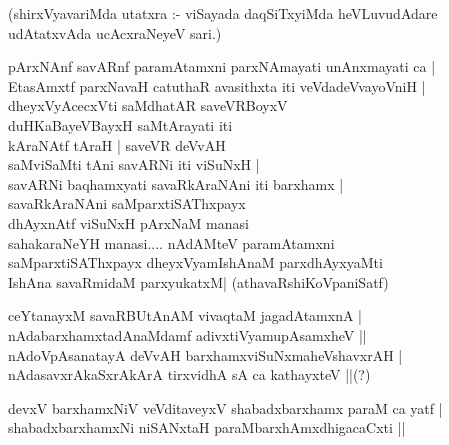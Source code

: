 (shirxVyavariMda utatxra :- viSayada daqSiTxyiMda heVLuvudAdare udAtatxvAda ucAcxraNeyeV sari.)
\begin{itemize}
{\bf 
\item[33.] pArxNAnf savARnf paramAtamxni parxNAmayati unAnxmayati ca |\\\label{149}
EtasAmxtf parxNavaH catuthaR avasithxta iti veVdadeVvayoVniH |\\
dheyxVyAcecxVti saMdhatAR saveVRBoyxV \\
duHKaBayeVBayxH saMtArayati iti \\
kAraNAtf tAraH | saveVR deVvAH \\
saMviSaMti tAni savARNi iti viSuNxH |\\
savARNi baqhamxyati savaRkAraNAni iti barxhamx |\\
savaRkAraNAni saMparxtiSAThxpayx \\
dhAyxnAtf viSuNxH pArxNaM manasi \\
sahakaraNeYH manasi.... nAdAMteV paramAtamxni\\
saMparxtiSAThxpayx dheyxVyamIshAnaM parxdhAyxyaMti\\
IshAna savaRmidaM parxyukatxM|\label{149d}
\hfill{(athavaRshiKoVpaniSatf)}
\item[34.] ceYtanayxM savaRBUtAnAM vivaqtaM jagadAtamxnA |\\\label{149a}
nAdabarxhamxtadAnaMdamf adivxtiVyamupAsamxheV ||\\
nAdoVpAsanatayA deVvAH barxhamxviSuNxmaheVshavxrAH |\\
nAdasavxrAkaSxrAkArA tirxvidhA sA ca kathayxteV ||\quad(?)\label{149b}
\item[35.] devxV barxhamxNiV veVditaveyxV shabadxbarxhamx paraM ca yatf |\\\label{149c}
shabadxbarxhamxNi niSANxtaH paraMbarxhAmxdhigacaCxti ||\label{160}

}
\end{itemize}
